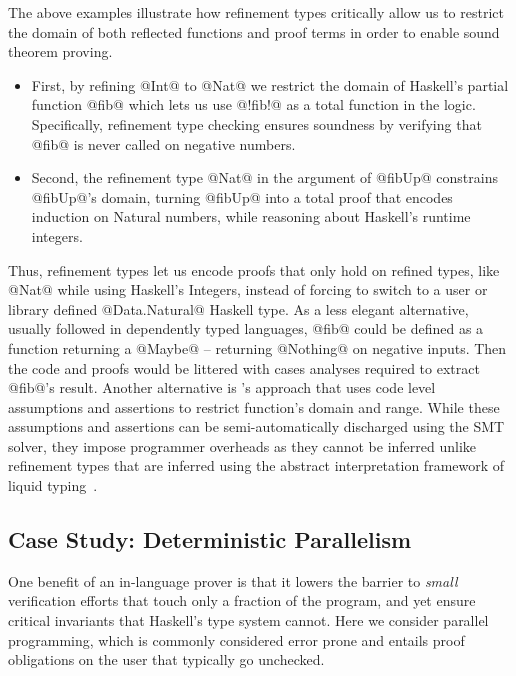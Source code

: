 The above examples illustrate how refinement types
critically allow us to restrict the domain of both
reflected functions and proof terms in order to
enable sound theorem proving.
%
\begin{itemize}
  \item {}
  First, by refining @Int@ to @Nat@ we restrict
  the domain of Haskell's partial function @fib@
  which lets us use @!fib!@ as a total function in
  the logic. Specifically, refinement type checking
  ensures soundness by verifying that @fib@ is never
  called on negative numbers.
%
\item {}
  Second, the refinement type @Nat@
  in the argument of @fibUp@ constrains @fibUp@'s
  domain, turning @fibUp@ into a total proof that
  encodes induction on Natural numbers, while
  reasoning about Haskell's runtime integers.
\end{itemize}
%
Thus, refinement types let us encode proofs that
only hold on refined types, like @Nat@ while using
Haskell's Integers, instead of forcing to switch
to a user or library defined @Data.Natural@ Haskell
type.
%
As a less elegant alternative, usually followed
in dependently typed languages, @fib@ could be
defined as a function returning a @Maybe@ -- \ie
returning @Nothing@ on negative inputs.
Then the code and proofs would be littered with cases analyses
required to extract @fib@'s result.
%
Another alternative is \dafny's approach
that uses code level assumptions and assertions
to restrict function's domain and range.
%
While these assumptions and assertions can
be semi-automatically discharged using the
SMT solver, they impose programmer overheads
as they cannot be inferred unlike refinement
types that are inferred using
the abstract interpretation framework of
liquid typing~\cite{LiquidPLDI08}.


\subsection{Case Study: Deterministic Parallelism}
\label{sec:detpar}


One benefit of an in-language prover is that it lowers
the barrier to \emph{small} verification efforts that
touch only a fraction of the program, and yet
ensure critical invariants that Haskell's type
system cannot.
%
Here we consider parallel programming, which is commonly
considered error prone and entails proof obligations on
the user that typically go unchecked.

